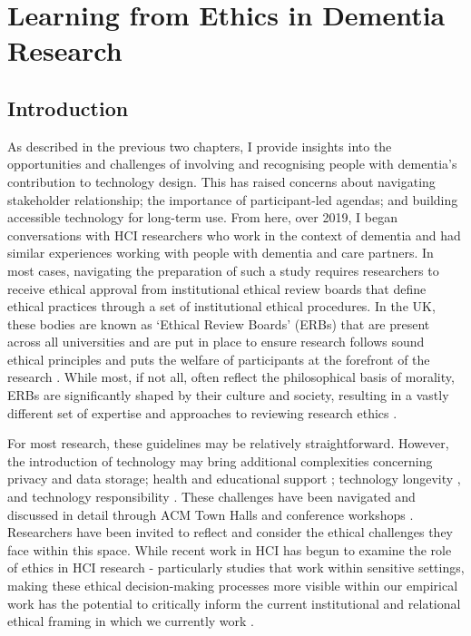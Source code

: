 \chapter{Learning from Ethics in Dementia Research}
\label{EthicsChapter}

\section{Introduction}
\label{Ethics:Intro}
As described in the previous two chapters, I provide insights into the opportunities and challenges of involving and recognising people with dementia's contribution to technology design. This has raised concerns about navigating stakeholder relationship; the importance of participant-led agendas; and building accessible technology for long-term use. From here, over 2019, I began conversations with HCI researchers who work in the context of dementia and had similar experiences working with people with dementia and care partners. In most cases, navigating the preparation of such a study requires researchers to receive ethical approval from institutional ethical review boards that define ethical practices through a set of institutional ethical procedures. In the UK, these bodies are known as ‘Ethical Review Boards’ (ERBs) that are present across all universities and are put in place to ensure research follows sound ethical principles and puts the welfare of participants at the forefront of the research \citep{pachana_can_2014}. While most, if not all, often reflect the philosophical basis of morality, ERBs are significantly shaped by their culture and society, resulting in a vastly different set of expertise and approaches to reviewing research ethics \citep{flicker_ethical_2007}.

For most research, these guidelines may be relatively straightforward. However, the introduction of technology may bring additional complexities concerning privacy and data storage; health and educational support \citep{gray2016inscribing}; technology longevity \citep{foley_printer_2019}, and technology responsibility \citep{ferrario_software_2014}. These challenges have been navigated and discussed in detail through ACM Town Halls and conference workshops \citep{frauenberger_research_2017,munteanu_sigchi_2019,waycott_ethical_2015}. Researchers have been invited to reflect and consider the ethical challenges they face within this space. While recent work in HCI has begun to examine the role of ethics in HCI research - particularly studies that work within sensitive settings, making these ethical decision-making processes more visible within our empirical work has the potential to critically inform the current institutional and relational ethical framing in which we currently work \citep{oyebode_mental_2005}.


